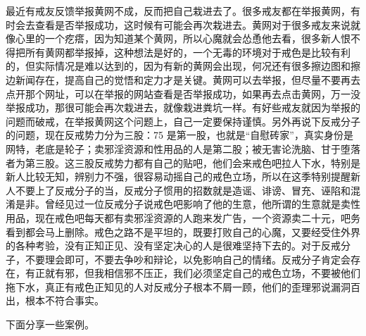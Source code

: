 最近有戒友反馈举报黄网不成，反而把自己栽进去了。很多戒友都在举报黄网，有时会去查看是否举报成功，这时候有可能会再次栽进去。黄网对于很多戒友来说就像心里的一个疙瘩，因为知道某个黄网，所以心魔就会怂恿他去看，很多新人恨不得把所有黄网都举报掉，这种想法是好的，一个无毒的环境对于戒色是比较有利的，但实际情况是难以达到的，因为有新的黄网会出现，何况还有很多擦边图和擦边新闻存在，提高自己的觉悟和定力才是关键。黄网可以去举报，但尽量不要再去点开那个网址，可以在举报的网站查看是否举报成功，如果再去点击黄网，万一没举报成功，那很可能会再次栽进去，就像栽进粪坑一样。有好些戒友就因为举报的问题而破戒，在举报黄网这个问题上，自己一定要保持谨慎。另外再说下反戒分子的问题，现在反戒势力分为三股：75 是第一股，也就是“自慰砖家”，真实身份是网特，老底是轮子；卖邪淫资源和性用品的人是第二股；被无害论洗脑、甘于堕落者为第三股。这三股反戒势力都有自己的贴吧，他们会来戒色吧拉人下水，特别是新人比较无知，辨别力不强，很容易动摇自己的戒色立场，所以在这季特别提醒新人不要上了反戒分子的当，反戒分子惯用的招数就是造谣、诽谤、冒充、诬陷和混淆是非。曾经见过一位反戒分子说戒色吧影响了他的生意，他所谓的生意就是卖性用品，现在戒色吧每天都有卖邪淫资源的人跑来发广告，一个资源卖二十元，吧务看到都会马上删除。戒色之路不是平坦的，既要打败自己的心魔，又要经受住外界的各种考验，没有正知正见、没有坚定决心的人是很难坚持下去的。对于反戒分子，不要理会即可，不要去争吵和辩论，以免影响自己的情绪。反戒分子肯定会存在，有正就有邪，但我相信邪不压正，我们必须坚定自己的戒色立场，不要被他们拖下水，真正有戒色正知见的人对反戒分子根本不屑一顾，他们的歪理邪说漏洞百出，根本不符合事实。

下面分享一些案例。

